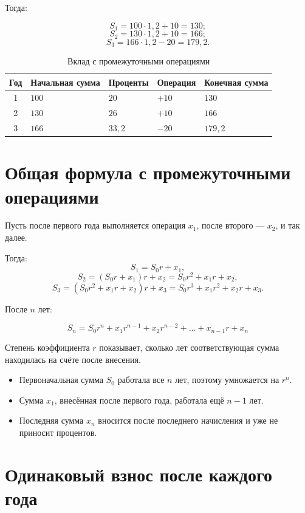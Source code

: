 \documentclass[a4paper,12pt]{article}
\newcommand{\formula}[1]{%
  \[
    \boxed{\displaystyle #1}
  \]
}
\begin{document}
Тогда:

\[
S_1=100\cdot1{,}2+10=130;
\]
\[
S_2=130\cdot1{,}2+10=166;
\]
\[
S_3=166\cdot1{,}2-20=179{,}2.
\]

\begin{table}[ht]
\centering
\caption{Вклад с промежуточными операциями}
\begin{tabularx}{0.9\linewidth}{@{}cXXXX@{}}
\toprule
Год &
Начальная сумма &
Проценты &
Операция &
Конечная сумма \\
\midrule
1 & \(100\) & \(20\) & \(+10\) & \(130\) \\
2 & \(130\) & \(26\) & \(+10\) & \(166\) \\
3 & \(166\) & \(33{,}2\) & \(-20\) & \(179{,}2\) \\
\bottomrule
\end{tabularx}
\end{table}

\section{Общая формула с промежуточными операциями}

Пусть после первого года выполняется операция \(x_1\), после второго ---
\(x_2\), и так далее.

Тогда:
\[
S_1=S_0r+x_1,
\]
\[
S_2=(S_0r+x_1)r+x_2
=S_0r^2+x_1r+x_2,
\]
\[
S_3=(S_0r^2+x_1r+x_2)r+x_3
=S_0r^3+x_1r^2+x_2r+x_3.
\]

После \(n\) лет:

\formula{
S_n
=
S_0r^n
+x_1r^{n-1}
+x_2r^{n-2}
+\ldots
+x_{n-1}r
+x_n
}

Степень коэффициента \(r\) показывает, сколько лет соответствующая сумма
находилась на счёте после внесения.

\begin{itemize}
  \item Первоначальная сумма \(S_0\) работала все \(n\) лет, поэтому умножается
  на \(r^n\).
  \item Сумма \(x_1\), внесённая после первого года, работала ещё \(n-1\) лет.
  \item Последняя сумма \(x_n\) вносится после последнего начисления и уже
  не приносит процентов.
\end{itemize}

\section{Одинаковый взнос после каждого года}
\end{document}
